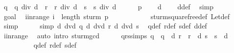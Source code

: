 \begin{isabellebody}
\ q{\isacharprime}\ {\isasymequiv}\ {\isachardoublequoteopen}q\ div\ d{\isachardoublequoteclose}\ \ r{\isacharprime}\ {\isasymequiv}\ {\isachardoublequoteopen}r\ div\ d{\isachardoublequoteclose}\ \ s{\isacharprime}\ {\isasymequiv}\ {\isachardoublequoteopen}s\ div\ d{\isachardoublequoteclose}\isanewline
\ \ \ \ \isamarkupfalse%
\ {\isacharbackquoteopen}p\ {\isasymnoteq}\ {}{\isacharbackquoteclose}\ \isamarkupfalse%
\ {\isachardoublequoteopen}d\ {\isasymnoteq}\ {}{\isachardoublequoteclose}\ \isamarkupfalse%
\ d{\isacharunderscore}def\ \isamarkupfalse%
\ simp\isanewline
\ \ \ \ \isamarkupfalse%
\ goal{}{\isacharparenleft}{}{\isacharparenright}\ \isamarkupfalse%
\ i{\isacharunderscore}in{\isacharunderscore}range{\isacharcolon}\ {\isachardoublequoteopen}i\ {\isacharless}\ length\ {\isacharparenleft}sturm\ p{\isacharparenright}\ {\isacharminus}\ {}{\isachardoublequoteclose}\isanewline
\ \ \ \ \ \ \ \ \isamarkupfalse%
\ sturm{\isacharunderscore}squarefree{\isacharprime}{\isacharunderscore}def\ Let{\isacharunderscore}def\ \isamarkupfalse%
\ simp\isanewline
\ \ \ \ \isamarkupfalse%
\ {\isacharbrackleft}simp{\isacharbrackright}{\isacharcolon}\ {\isachardoublequoteopen}d\ dvd\ q{\isachardoublequoteclose}\ {\isachardoublequoteopen}d\ dvd\ r{\isachardoublequoteclose}\ {\isachardoublequoteopen}d\ dvd\ s{\isachardoublequoteclose}\ \isamarkupfalse%
\ q{\isacharunderscore}def\ r{\isacharunderscore}def\ s{\isacharunderscore}def\ d{\isacharunderscore}def\isanewline
\ \ \ \ \ \ \ \ \isamarkupfalse%
\ i{\isacharunderscore}in{\isacharunderscore}range\ \isamarkupfalse%
\ {\isacharparenleft}auto\ intro{\isacharcolon}\ sturm{\isacharunderscore}gcd{\isacharparenright}\isanewline
\ \ \ \ \isamarkupfalse%
\ qrs{\isacharunderscore}simps{\isacharcolon}\ {\isachardoublequoteopen}q\ {\isacharequal}\ q{\isacharprime}\ {\isacharasterisk}\ d{\isachardoublequoteclose}\ {\isachardoublequoteopen}r\ {\isacharequal}\ r{\isacharprime}\ {\isacharasterisk}\ d{\isachardoublequoteclose}\ {\isachardoublequoteopen}s\ {\isacharequal}\ s{\isacharprime}\ {\isacharasterisk}\ d{\isachardoublequoteclose}\ \isanewline
\ \ \ \ \ \ \ \ \isamarkupfalse%
\ q{\isacharprime}{\isacharunderscore}def\ r{\isacharprime}{\isacharunderscore}def\ s{\isacharprime}{\isacharunderscore}def\ \isamarkupfalse%

\end{isabellebody}
